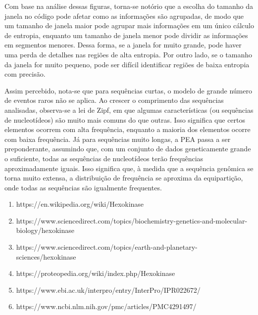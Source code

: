 \documentclass{article}
\begin{document}
Com base na análise dessas figuras, torna-se notório que  a escolha do tamanho da janela no código pode afetar como as informações são agrupadas, de modo que um tamanho de janela maior pode agrupar mais informações em um único cálculo de entropia, enquanto um tamanho de janela menor pode dividir as informações em segmentos menores. Dessa forma, se a janela for muito grande, pode haver uma perda de detalhes nas regiões de alta entropia. Por outro lado, se o tamanho da janela for muito pequeno, pode ser difícil identificar regiões de baixa entropia com precisão.

Assim percebido, nota-se que para sequências curtas, o modelo de grande número de eventos raros não se aplica. Ao crescer o comprimento das sequências analisadas, observa-se a lei de Zipf, em que algumas características (ou sequências de nucleotídeos) são muito mais comuns do que outras. Isso significa que certos elementos ocorrem com alta frequência, enquanto a maioria dos elementos ocorre com baixa frequência. Já para sequências muito longas, a PEA passa a ser preponderante, assumindo que, com um conjunto de dados geneticamente grande o suficiente, todas as sequências de nucleotídeos terão frequências aproximadamente iguais. Isso significa que, à medida que a sequência genômica se torna muito extensa, a distribuição de frequência se aproxima da equipartição, onde todas as sequências são igualmente frequentes.




\begin{enumerate}
    \item https://en.wikipedia.org/wiki/Hexokinase
    \item https://www.sciencedirect.com/topics/biochemistry-genetics-and-molecular-biology/hexokinase
    \item https://www.sciencedirect.com/topics/earth-and-planetary-sciences/hexokinase
    \item https://proteopedia.org/wiki/index.php/Hexokinase
    \item https://www.ebi.ac.uk/interpro/entry/InterPro/IPR022672/
    \item https://www.ncbi.nlm.nih.gov/pmc/articles/PMC4291497/
    
\end{enumerate}
\end{document}
